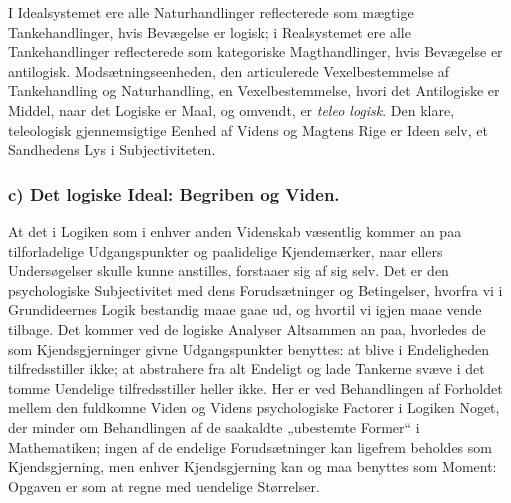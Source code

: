 \documentclass[11pt]{book}
\newcommand{\opage}[1]{\marginnote{\footnotesize\textit{[#1]}}}
\begin{document}
I Idealsystemet ere alle Naturhandlinger reflecterede som mægtige
Tankehandlinger, hvis Bevægelse er logisk; i Realsystemet ere alle
Tankehandlinger reflecterede som kategoriske Magthandlinger, hvis
Bevægelse er antilogisk. Modsætningseenheden, den articulerede
Vexelbestemmelse af Tankehandling og Naturhandling, en
Vexelbestemmelse, hvori det Antilogiske er Middel, naar det Logiske er
Maal, og omvendt, er \emph{teleo\-%
logisk}. Den klare, teleologisk gjennemsigtige Eenhed af Videns og
Magtens Rige er Ideen selv, et Sandhedens Lys i Subjectiviteten.

\opage{230} \setcounter{footnote}{0}%
\subsubsection*{c) Det logiske Ideal: Begriben og Viden.}

At det i Logiken som i enhver anden Videnskab væsentlig kommer an paa
tilforladelige Udgangspunkter og paalidelige Kjendemærker, naar ellers
Undersøgelser skulle kunne anstilles, forstaaer sig af sig selv. Det er
den psychologiske Subjectivitet med dens Forudsætninger og Betingelser,
hvorfra vi i Grundideernes Logik bestandig maae gaae ud, og hvortil vi
igjen maae vende tilbage. Det kommer ved de logiske Analyser Altsammen an
paa, hvorledes de som Kjendsgjerninger givne Udgangspunkter benyttes: at
blive i Endeligheden tilfredsstiller ikke; at abstrahere fra alt Endeligt
og lade Tankerne svæve i det tomme Uendelige tilfredsstiller heller ikke.
Her er ved Behandlingen af Forholdet mellem den fuldkomne Viden og Videns
psychologiske Factorer i Logiken Noget, der minder om Behandlingen af de
saakaldte „ubestemte Former“ i Mathematiken; ingen af de endelige
Forudsætninger kan ligefrem beholdes som Kjendsgjerning, men enhver
Kjendsgjerning kan og maa benyttes som Moment: Opgaven er som at regne
med uendelige Størrelser.
\end{document}
